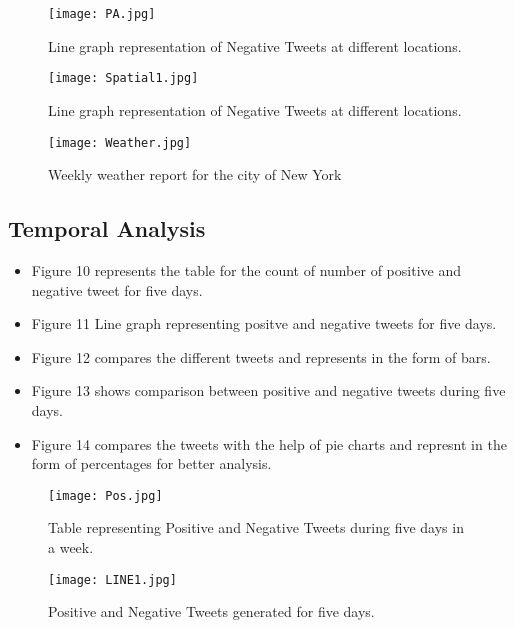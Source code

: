 \documentclass[12pt, oneside]{article}   	%
\begin{document}
\begin{figure}[!htb]
	\centering
	\texttt{[image: PA.jpg]}\\
	\caption{ Line graph representation of Negative Tweets at different locations.}
\end{figure}
\vspace*{1cm}
\begin{figure}[!htb]
	\centering
	\texttt{[image: Spatial1.jpg]}\\
	\caption{ Line graph representation of Negative Tweets at different locations.}
\end{figure}
\vspace*{1cm}
\begin{figure}[!htb]
	\centering
	\texttt{[image: Weather.jpg]}\\
	\caption{ Weekly weather report for the city of New York}
\end{figure}
\vspace*{1cm}
\subsection{Temporal Analysis}

\begin{itemize}
	\item Figure 10 represents the table for the count of number of positive and negative tweet for five days.
	\item Figure 11 Line graph representing positve and negative tweets for five days.
	\item Figure 12 compares the different tweets and represents in the form of bars.
	\item Figure 13 shows comparison between positive and negative tweets during five days.
	\item Figure 14 compares the tweets with the help of pie charts and represnt in the form of percentages for better analysis.
\end{itemize}
\begin{figure}[!htb]
	\centering
	\texttt{[image: Pos.jpg]}\\
	\caption{ Table representing Positive  and Negative Tweets during five days in a week.}
\end{figure}

\begin{figure}[!htb]
	\centering
	\texttt{[image: LINE1.jpg]}\\
	\caption{ Positive and Negative Tweets generated for five days.}
\end{figure}
\end{document}
